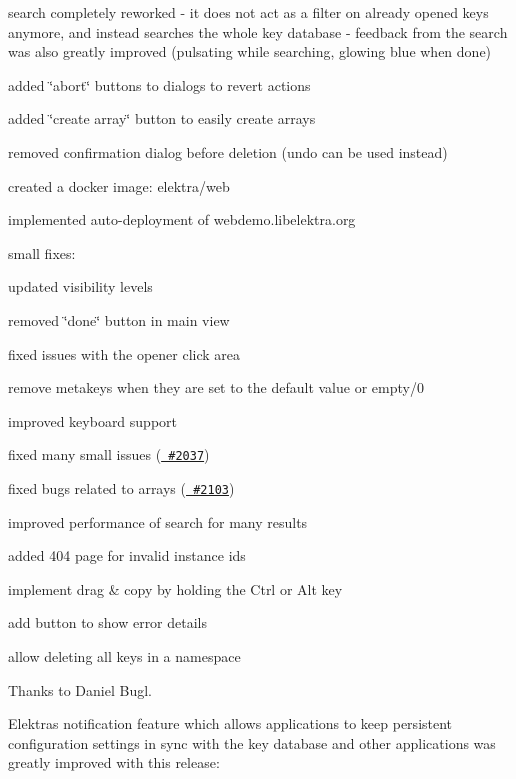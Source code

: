 \begin{DoxyItemize}
\item search completely reworked -\/ it does not act as a filter on already opened keys anymore, and instead searches the whole key database -\/ feedback from the search was also greatly improved (pulsating while searching, glowing blue when done)
\item added \char`\"{}abort\char`\"{} buttons to dialogs to revert actions
\item added \char`\"{}create array\char`\"{} button to easily create arrays
\item removed confirmation dialog before deletion (undo can be used instead)
\item created a docker image\+: {\ttfamily elektra/web}
\item implemented auto-\/deployment of webdemo.\+libelektra.\+org
\item small fixes\+:
\begin{DoxyItemize}
\item updated visibility levels
\item removed \char`\"{}done\char`\"{} button in main view
\item fixed issues with the opener click area
\item remove metakeys when they are set to the default value or empty/0
\item improved keyboard support
\item fixed many small issues (\href{https://issues.libelektra.org/2037}{\texttt{ \#2037}})
\end{DoxyItemize}
\end{DoxyItemize}


\begin{DoxyItemize}
\item fixed bugs related to arrays (\href{https://issues.libelektra.org/2103}{\texttt{ \#2103}})
\item improved performance of search for many results
\item added 404 page for invalid instance ids
\item implement drag \& copy by holding the Ctrl or Alt key
\item add button to show error details
\item allow deleting all keys in a namespace
\end{DoxyItemize}

Thanks to Daniel Bugl.

Elektra\textquotesingle{}s notification feature which allows applications to keep persistent configuration settings in sync with the key database and other applications was greatly improved with this release\+:


